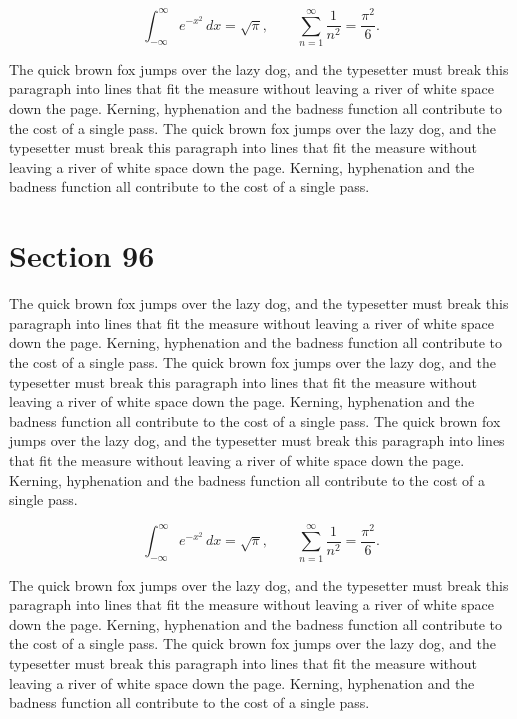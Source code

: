 \documentclass{article}
\begin{document}
\begin{equation}
\int_{-\infty}^{\infty} e^{-x^{2}}\,dx = \sqrt{\pi}, \qquad
\sum_{n=1}^{\infty} \frac{1}{n^{2}} = \frac{\pi^{2}}{6}.
\end{equation}

The quick brown fox jumps over the lazy dog, and the typesetter must break this paragraph into lines that fit the measure without leaving a river of white space down the page. Kerning, hyphenation and the badness function all contribute to the cost of a single pass. The quick brown fox jumps over the lazy dog, and the typesetter must break this paragraph into lines that fit the measure without leaving a river of white space down the page. Kerning, hyphenation and the badness function all contribute to the cost of a single pass. 
\section{Section 96}
The quick brown fox jumps over the lazy dog, and the typesetter must break this paragraph into lines that fit the measure without leaving a river of white space down the page. Kerning, hyphenation and the badness function all contribute to the cost of a single pass. The quick brown fox jumps over the lazy dog, and the typesetter must break this paragraph into lines that fit the measure without leaving a river of white space down the page. Kerning, hyphenation and the badness function all contribute to the cost of a single pass. The quick brown fox jumps over the lazy dog, and the typesetter must break this paragraph into lines that fit the measure without leaving a river of white space down the page. Kerning, hyphenation and the badness function all contribute to the cost of a single pass. 

\begin{equation}
\int_{-\infty}^{\infty} e^{-x^{2}}\,dx = \sqrt{\pi}, \qquad
\sum_{n=1}^{\infty} \frac{1}{n^{2}} = \frac{\pi^{2}}{6}.
\end{equation}

The quick brown fox jumps over the lazy dog, and the typesetter must break this paragraph into lines that fit the measure without leaving a river of white space down the page. Kerning, hyphenation and the badness function all contribute to the cost of a single pass. The quick brown fox jumps over the lazy dog, and the typesetter must break this paragraph into lines that fit the measure without leaving a river of white space down the page. Kerning, hyphenation and the badness function all contribute to the cost of a single pass. 
\end{document}
